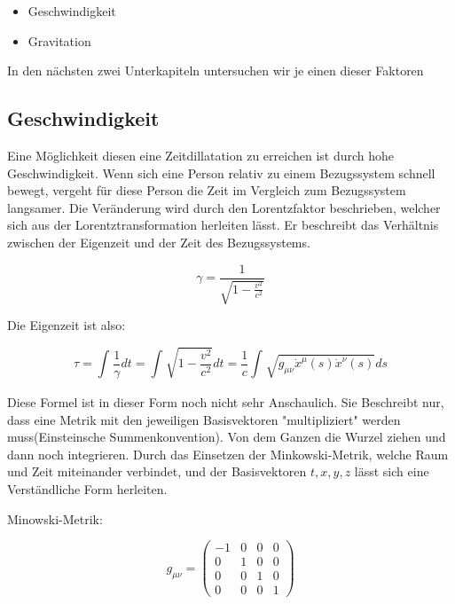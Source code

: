 \documentclass[]{article}
\begin{document}
	\begin{itemize}
		\item Geschwindigkeit
		\item Gravitation	
	\end{itemize}

	In den n\"achsten zwei Unterkapiteln untersuchen wir je einen dieser Faktoren
	
\subsection{Geschwindigkeit}

	Eine M\"oglichkeit diesen eine Zeitdillatation zu erreichen ist durch hohe Geschwindigkeit. Wenn sich eine Person relativ zu einem Bezugssystem schnell bewegt, vergeht f\"ur diese Person die Zeit im Vergleich zum Bezugssystem langsamer. Die Ver\"anderung wird durch den Lorentzfaktor beschrieben, welcher sich aus der Lorentztransformation herleiten l\"asst. Er beschreibt das Verh\"altnis zwischen der Eigenzeit und der Zeit des Bezugssystems.
	
	\begin{equation}
	 	\gamma=\frac{1}{\sqrt{1-\frac{v^2}{c^2}}} 
	\end{equation}
	
	
	
	Die Eigenzeit ist also:
	
	\begin{equation}
		\tau
		=
		\int_{}^{}\frac{1}{\gamma}dt=\int_{}^{}\sqrt{1-\frac{v^2}{c^2}}dt
		=
		\frac{1}{c}\int_{}^{}\sqrt{g_{\mu\nu}\dot{x}^{\mu}(s)\dot{x}^{\nu}(s)}ds
	\end{equation}
	
	Diese Formel ist in dieser Form noch nicht sehr Anschaulich. Sie Beschreibt nur, dass eine Metrik mit den jeweiligen Basisvektoren "multipliziert" werden muss(Einsteinsche Summenkonvention). Von dem Ganzen die Wurzel ziehen und dann noch integrieren.
	Durch das Einsetzen der Minkowski-Metrik, welche Raum und Zeit miteinander verbindet, und der Basisvektoren $t, x, y, z$ l\"asst sich eine Verst\"andliche Form herleiten. 
	
	 Minowski-Metrik:
	 
	\begin{equation}
		g_{\mu\nu}=
   		 \begin{pmatrix}
		 		-1 & 0 & 0 & 0 \\
	    		0 & 1 & 0 & 0 \\
	 			0 & 0 & 1 & 0 \\
	  			0 & 0 & 0 & 1
	 	\end{pmatrix}
	\end{equation}
	
\end{document}
